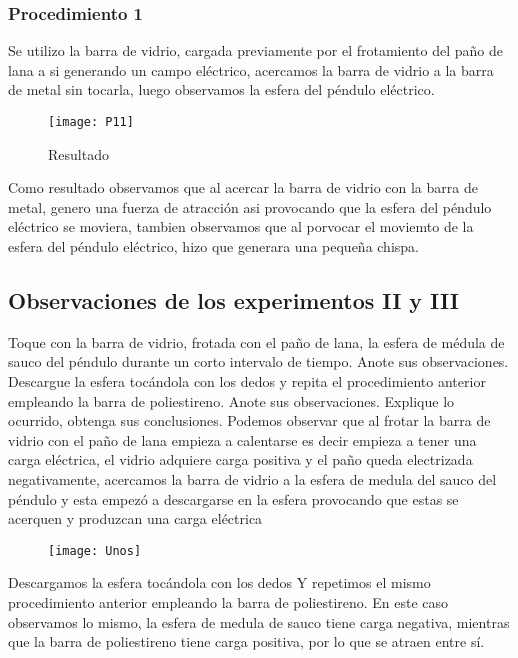 \documentclass[14pt]{article}
\begin{document}
\begin{multicols}{2}
\subsubsection*{Procedimiento 1}
Se utilizo la barra de vidrio, cargada previamente por el frotamiento del paño de lana a si generando un campo eléctrico, acercamos la barra de vidrio a la barra de metal sin tocarla, luego observamos la esfera del péndulo eléctrico.

\begin{figure}[h]
\centering
\texttt{[image: P11]}
\caption{Resultado}
\end{figure}

Como resultado observamos que al acercar la barra de vidrio con la barra de metal, genero una fuerza de atracción asi provocando que la esfera del péndulo eléctrico se moviera, tambien observamos que al porvocar el moviemto de la esfera del péndulo eléctrico, hizo que generara una pequeña chispa.
\subsection{Observaciones de los experimentos II y III}
Toque con la barra de vidrio, frotada con el paño de lana, la esfera de médula de sauco del péndulo durante un corto intervalo de tiempo. Anote sus observaciones. Descargue la esfera tocándola con los dedos y repita el procedimiento anterior empleando la barra de poliestireno. Anote sus observaciones. Explique lo ocurrido, obtenga sus conclusiones.
Podemos observar que al frotar la barra de vidrio con el paño de lana empieza a calentarse es decir empieza a tener una carga eléctrica, el vidrio adquiere carga positiva y el paño queda electrizada negativamente, acercamos la barra de vidrio a la esfera de medula del sauco del péndulo y esta empezó a descargarse en la esfera provocando que estas se acerquen y produzcan una carga eléctrica\\
\begin{figure}
	\begin{center}
		\texttt{[image: Unos]}\\

	\end{center}
\end{figure}

Descargamos la esfera tocándola con los dedos
Y repetimos el mismo procedimiento anterior empleando la barra de poliestireno. 
En este caso observamos lo mismo, la esfera de medula de sauco tiene carga negativa, mientras que la barra de poliestireno tiene carga positiva, por lo que se atraen entre sí.


\end{multicols}
\end{document}
